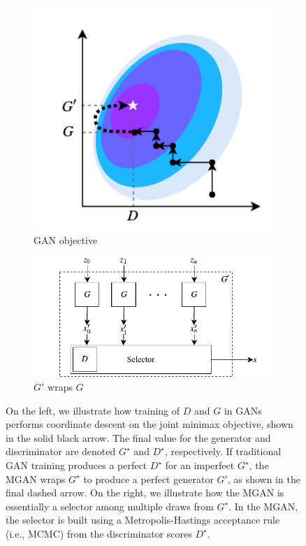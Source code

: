 \documentclass{article}
\begin{document}
\begin{figure}[bhtp]
    \centering
    \begin{subfigure}[t]{2.25in}
       \centering
       \includegraphics[scale=1.0]{figures/coord_descent.pdf}
       \caption{GAN objective}
    \end{subfigure}
    \hfill
    \begin{subfigure}[t]{3in}
       \centering
       \includegraphics[scale=1.0]{figures/block_diag.pdf}
       \caption{$G'$ wraps $G$}
    \end{subfigure}
    \caption{{\small
    On the left, we illustrate how training of $D$ and $G$ in GANs performs coordinate descent on the joint minimax objective, shown in the solid black arrow.
    The final value for the generator and discriminator are denoted $G^\star$ and $D^\star$, respectively.
    If traditional GAN training produces a perfect $D^\star$ for an imperfect $G^\star$, the MGAN wraps $G^\star$ to produce a perfect generator $G'$, as shown in the final dashed arrow.
    On the right, we illustrate how the MGAN is essentially a selector among multiple draws from $G^\star$.
    In the MGAN, the selector is built using a Metropolis-Hastings acceptance rule (i.e., MCMC) from the discriminator scores $D^\star$.
    }}
    \label{fig:block_diag}
\end{figure}
\end{document}
